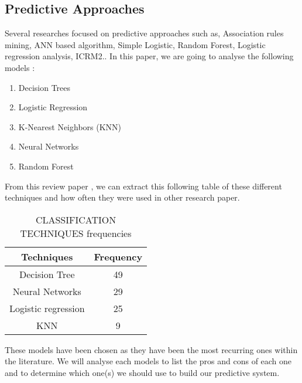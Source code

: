 \documentclass[conference]{IEEEtran}
\begin{document}
\subsection{Predictive Approaches}
\label{subsec:soa_predictiveapproach}
Several researches focused on predictive approaches such as, Association rules mining, ANN based algorithm, Simple Logistic, 
 Random Forest, Logistic regression analysis, ICRM2.\cite{mduma_survey_2019}. 
In this paper, we are going to analyse the following models \cite{mduma_survey_2019}\cite{quinlan_induction_1986,yadav_mining_2012,heredia_student_2015,ramirez_prediction_2018,cox_regression_1958,perez_modelo_2018,pandey_data_2011,cover_nearest_1967,mardolkar_forecasting_2020,zhang_neural_2000,rudin_stop_2019,siri_predicting_2015,m_alban_she_is_with_the_faculty_of_engineering_and_applied_sciences_of_the_technical_university_cotopaxi_neural_2019,cortes_support-vector_1995,boser_training_1992,cardona_predicting_2019,naicker_linear_2020,lee_machine_2019,behr_early_2020,friedman_stochastic_2002,eckert_analysis_2015,tenpipat_student_2020,liang_machine_2016,liang_big_2016,fischer_angulo_modelo_2012,miranda_analysis_2017,viloria_integration_2019,kemper_predicting_2020,agrusti_university_2019}:
\begin{enumerate}
\item Decision Trees
\item Logistic Regression
\item K-Nearest Neighbors (KNN)
\item Neural Networks
\item Random Forest
\end{enumerate}
From this review paper \cite{agrusti_university_2019}, we can extract this following table of these different techniques and how often they were used in other research paper.
\begin{table}[H]
    \centering
    \caption{CLASSIFICATION TECHNIQUES frequencies\cite{agrusti_university_2019}}
    \begin{tabular}{|c|c|}
        \hline
        \textbf{Techniques} & \textbf{Frequency}\\
        \hline
        Decision Tree & 49\\
        \hline
        Neural Networks & 29\\
        \hline
        Logistic regression & 25\\
        \hline
        KNN & 9\\
        \hline
    \end{tabular}
    \label{tab:class_tech_freq_agrusti}
\end{table}
These models have been chosen as they have been the most recurring ones within the literature. We will analyse each models to list the pros and cons of each one and to determine which one(s) we should use to build our predictive system.
\end{document}
